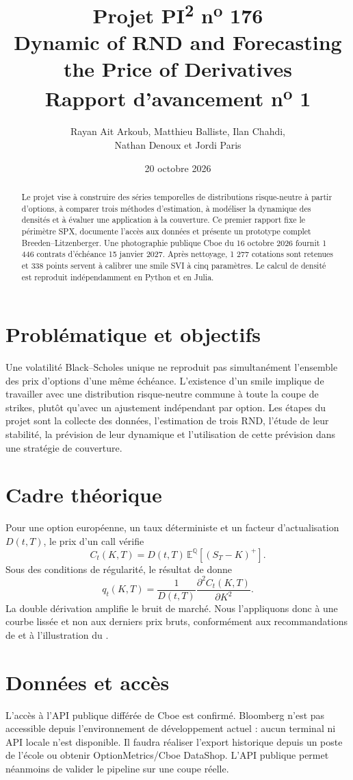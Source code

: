 \documentclass[11pt,a4paper]{article}
\title{\textcolor{projectblue}{Projet PI\textsuperscript{2} n\textsuperscript{o} 176}\\
\Large Dynamic of RND and Forecasting the Price of Derivatives\\[0.5em]
\large Rapport d'avancement n\textsuperscript{o} 1}
\author{Rayan Ait Arkoub, Matthieu Balliste, Ilan Chahdi,\\Nathan Denoux et Jordi Paris}
\date{20 octobre 2026}
\begin{document}
\maketitle

\begin{abstract}
Le projet vise à construire des séries temporelles de distributions risque-neutre
à partir d'options, à comparer trois méthodes d'estimation, à modéliser la dynamique
des densités et à évaluer une application à la couverture. Ce premier rapport fixe
le périmètre SPX, documente l'accès aux données et présente un prototype complet
Breeden--Litzenberger. Une photographie publique Cboe du 16 octobre 2026 fournit
1 446 contrats d'échéance 15 janvier 2027. Après nettoyage, 1 277 cotations sont
retenues et 338 points servent à calibrer une smile SVI à cinq paramètres. Le calcul
de densité est reproduit indépendamment en Python et en Julia.
\end{abstract}

\section{Problématique et objectifs}
Une volatilité Black--Scholes unique ne reproduit pas simultanément l'ensemble des
prix d'options d'une même échéance. L'existence d'un smile implique de travailler
avec une distribution risque-neutre commune à toute la coupe de strikes, plutôt
qu'avec un ajustement indépendant par option. Les étapes du projet sont la collecte
des données, l'estimation de trois RND, l'étude de leur stabilité, la prévision de
leur dynamique et l'utilisation de cette prévision dans une stratégie de couverture.

\section{Cadre théorique}
Pour une option européenne, un taux déterministe et un facteur d'actualisation
$D(t,T)$, le prix d'un call vérifie
\[
C_t(K,T)=D(t,T)\,\mathbb{E}^{\mathbb{Q}}[(S_T-K)^+].
\]
Sous des conditions de régularité, le résultat de \textcite{breeden_litzenberger_1978}
donne
\[
q_t(K,T)=\frac{1}{D(t,T)}\frac{\partial^2 C_t(K,T)}{\partial K^2}.
\]
La double dérivation amplifie le bruit de marché. Nous l'appliquons donc à une
courbe lissée et non aux derniers prix bruts, conformément aux recommandations de
\textcite{figlewski_2010} et à l'illustration du \textcite{bsic_2026}.

\section{Données et accès}
L'accès à l'API publique différée de Cboe est confirmé. Bloomberg n'est pas
accessible depuis l'environnement de développement actuel : aucun terminal ni API
locale n'est disponible. Il faudra réaliser l'export historique depuis un poste de
l'école ou obtenir OptionMetrics/Cboe DataShop. L'API publique permet néanmoins de
valider le pipeline sur une coupe réelle.
\end{document}
